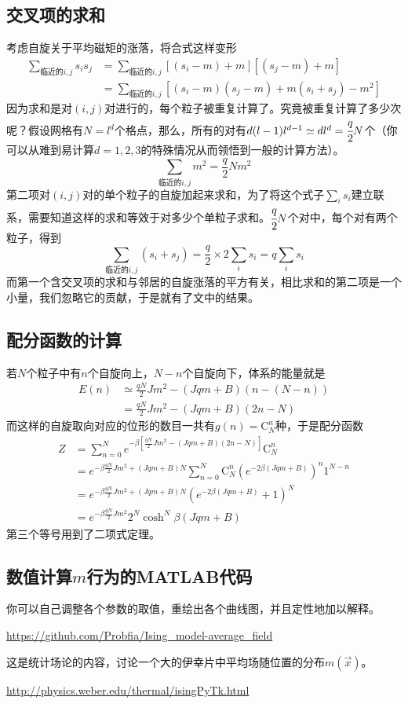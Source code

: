 \documentclass[a4paper,11pt]{ctexart}
\newcommand{\beq}{\begin{equation}}
\newcommand{\eeq}{\end{equation}}
\newcommand{\bea}{\begin{equation}\begin{aligned}}
\newcommand{\eea}{\end{aligned}\end{equation}}
\begin{document}
\subsection{交叉项的求和}
考虑自旋关于平均磁矩的涨落，将合式这样变形
\bea
\sum_{\text{临近的}i,j} s_i s_j &= \sum_{\text{临近的}i,j} [(s_i-m)+m][ (s_j-m)+m]\\
&= \sum_{\text{临近的}i,j}[(s_i-m)(s_j-m) +m(s_i+s_j) - m^2]
\eea
因为求和是对$(i,j)$对进行的，每个粒子被重复计算了。究竟被重复计算了多少次呢？假设网格有$N=l^d$个格点，那么，所有的对有$d(l-1)l^{d-1} \simeq dl^d=\cfrac{q}{2}N$个（你可以从难到易计算$d=1,2,3$的特殊情况从而领悟到一般的计算方法）。
\beq
\sum_{\text{临近的}i,j}m^2 =\frac{q}{2}Nm^2
\eeq
第二项对$(i,j)$对的单个粒子的自旋加起来求和，为了将这个式子$\sum_i s_i$建立联系，需要知道这样的求和等效于对多少个单粒子求和。$\cfrac{q}{2}N$个对中，每个对有两个粒子，得到
\beq
\sum_{\text{临近的}i,j} (s_i+s_j)= \frac{q}{2} \times 2 \sum_i s_i = q\sum_i s_i
\eeq
而第一个含交叉项的求和与邻居的自旋涨落的平方有关，相比求和的第二项是一个小量，我们忽略它的贡献，于是就有了文中的结果。
\subsection{配分函数的计算}
若$N$个粒子中有$n$个自旋向上，$N-n$个自旋向下，体系的能量就是
\bea
E(n) &\simeq \frac{qN}{2}Jm^2 - (Jqm+B)(n-(N-n))\\
&= \frac{qN}{2}Jm^2 - (Jqm+B)(2n-N)
\eea
而这样的自旋取向对应的位形的数目一共有$g(n) = \mathrm{C}_N^n$种，于是配分函数
\bea
Z &= \sum_{n=0}^N e^{-\beta[\frac{qN}{2}Jm^2 - (Jqm+B)(2n-N)]}\mathrm{C}_N^n\\
&= e^{-\beta \frac{qN}{2}Jm^2+(Jqm+B)N}\sum_{n=0}^N \mathrm{C}_N^n (e^{-2\beta(Jqm+B)})^n 1^{N-n} \\
&= e^{-\beta \frac{qN}{2}Jm^2+(Jqm+B)N}(e^{-2\beta(Jqm+B)}+1)^N\\
&= e^{-\beta \frac{qN}{2}Jm^2}2^N\cosh^N\beta(Jqm+B)
\eea
第三个等号用到了二项式定理。
\subsection{数值计算$m$行为的MATLAB代码}
你可以自己调整各个参数的取值，重绘出各个曲线图，并且定性地加以解释。
\par
\url{https://github.com/Probfia/Ising_model-average_field}
\par
这是统计场论的内容，讨论一个大的伊幸片中平均场随位置的分布$m(\vec{x})$。\par
\url{http://physics.weber.edu/thermal/isingPyTk.html}
\end{document}
